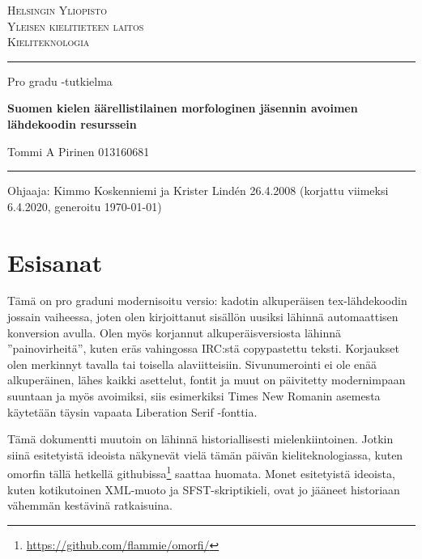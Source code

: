 \documentclass[free]{flammie}
\begin{document}
\parskip 2mm
\parindent 0mm

\begin{titlepage}
  \setlength{\parindent}{0mm}
  \sloppy
  \large \textsc{Helsingin Yliopisto \\
                 Yleisen kielitieteen laitos \\
                 Kieliteknologia}
  \vspace{5mm}

  \hrule height3pt
  \vspace{20mm}

  \begin{center}
    \large Pro gradu -tutkielma
    \linebreak \vfill

    \huge \textbf{Suomen kielen äärellistilainen morfologinen jäsennin avoimen
lähdekoodin resurssein}
    \vspace{20mm}

    \Large Tommi A Pirinen \linebreak
    \normalsize 013160681  %
    \vfill

  \end{center}
  \hrule height2pt
  \vspace{15mm}

  Ohjaaja: Kimmo Koskenniemi ja Krister Lindén
  \hfill
  26.4.2008 (korjattu viimeksi 6.4.2020, generoitu
    \today)    %
\end{titlepage}

\tableofcontents

\pagebreak

\section*{Esisanat}

Tämä on pro graduni modernisoitu versio: kadotin alkuperäisen tex-lähdekoodin
jossain vaiheessa, joten olen kirjoittanut sisällön uusiksi lähinnä
automaattisen konversion avulla. Olen myös korjannut alkuperäisversiosta
lähinnä ''painovirheitä'', kuten eräs vahingossa IRC:stä copypastettu teksti.
Korjaukset olen merkinnyt tavalla tai toisella alaviitteisiin. Sivunumerointi
ei ole enää alkuperäinen, lähes kaikki asettelut, fontit ja muut on päivitetty
modernimpaan suuntaan ja myös avoimiksi, siis esimerkiksi Times New Romanin
asemesta käytetään täysin vapaata Liberation Serif -fonttia.

Tämä dokumentti muutoin on lähinnä historiallisesti mielenkiintoinen. Jotkin
siinä esitetyistä ideoista näkynevät vielä tämän päivän kieliteknologiassa,
kuten omorfin tällä hetkellä
githubissa\footnote{\url{https://github.com/flammie/omorfi/}} saattaa huomata.
Monet esitetyistä ideoista, kuten kotikutoinen XML-muoto ja SFST-skriptikieli,
ovat jo jääneet historiaan vähemmän kestävinä ratkaisuina.
\end{document}
